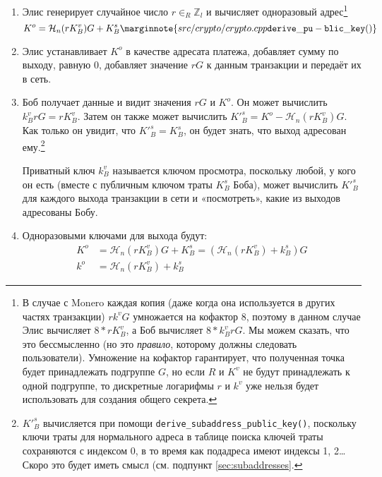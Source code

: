 \begin{enumerate}
	\item Элис генерирует случайное число $r \in_R \mathbb{Z}_l$ и вычисляет одноразовый адрес\footnote{В случае с Monero каждая копия (даже когда она используется в других частях транзакции) $r k^v G$ умножается на кофактор 8, поэтому в данном случае Элис вычисляет $8*r K^v_B$, а Боб вычисляет $8*k^v_B r G$. Мы можем сказать, что это бессмысленно (но это {\em правило}, которому должны следовать пользователи).  Умножение на кофактор гарантирует, что полученная точка будет принадлежать подгруппе $G$, но если $R$ и $K^v$ не будут принадлежать к одной подгруппе, то дискретные логарифмы $r$ и $k^v$ уже нельзя будет использовать для создания общего секрета.}\vspace{.175cm}
	\[K^o  = \mathcal{H}_n(r K_B^v)G + K_B^s\marginnote{src/crypto/ crypto.cpp {\tt derive\_pu- blic\_key()}}\]

	\item Элис устанавливает $K^o$ в качестве адресата платежа, добавляет сумму по выходу, равную 0, добавляет значение $r G$ к данным транзакции и передаёт их в сеть.

	\item Боб получает данные и видит значения $r G$ и $K^o$. Он может вычислить $k_B^v r G = r K_B^v$. Затем он также может вычислить $K'^s_B = K^o - \mathcal{H}_n(r K_B^v)G$. Как только он увидит, что $K'^s_B = K_B^s$, он будет знать, что выход адресован ему.\footnote{$K'^s_B $ вычисляется при помощи {\tt derive\_subaddress\_public\_key()}, поскольку ключи траты для нормального адреса в таблице поиска ключей траты сохраняются с индексом 0, в то время как подадреса имеют индексы 1, 2… Скоро это будет иметь смысл (см. подпункт \ref{sec:subaddresses}.}

	Приватный ключ $k_B^v$ называется ключом просмотра, поскольку любой, у кого он есть (вместе с публичным ключом траты $K_B^s$ Боба), может вычислить $K'^s_B$ для каждого выхода транзакции в сети и «посмотреть», какие из выходов адресованы Бобу.

	\item Одноразовыми ключами для выхода будут:\vspace{.175cm}
	\begin{align*}
		K^o &= \mathcal{H}_n(r K_B^v)G + K_B^s = (\mathcal{H}_n(r K_B^v) + k_B^s)G  \\ 
		k^o &= \mathcal{H}_n(r K_B^v) + k_B^s
	\end{align*}
\end{enumerate}

